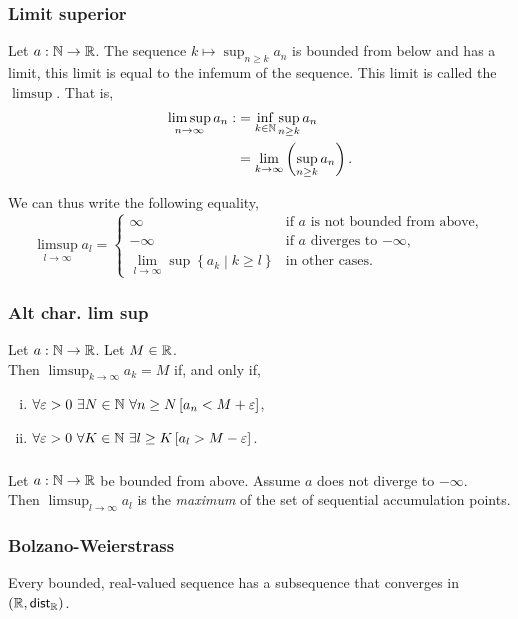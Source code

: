 \subsubsection*{Limit superior}
\udef Let $a : \mathbb{N} \to \mathbb{R}$. The sequence $k \mapsto \sup_{n \geq k} a_n$ is bounded
from below and has a limit, this limit is equal to the infemum of the sequence.
This limit is called the $\limsup$. That is,
\begin{align*}
    \limsup_{n \to \infty} a_n :&= \inf_{k \in \mathbb{N}} \sup_{n \geq k} a_n\\ 
        &= \lim_{k \to \infty} \left( \sup_{n \geq k} a_n \right).
\end{align*}

We can thus write the following equality,
\[
    \limsup_{l \to \infty} a_l = \begin{cases}
        \infty & \text{if  $a$ is not bounded from above},\\
        -\infty & \text{if $a$ diverges to $-\infty$},\\
        \lim_{l \to \infty} \sup \left\{ a_k \middle| k \geq l \right\}
            & \text{in other cases}.
    \end{cases}
\]

\newpage

\subsubsection*{Alt char. lim sup}
Let $a : \mathbb{N} \to \mathbb{R}$. Let $M \in \mathbb{R}$.\\
Then $\limsup_{k \to \infty} a_k = M$ if, and only if,
\begin{enumerate}[(i)]
    \item $\forall \varepsilon > 0\ \exists N \in \mathbb{N}\ \forall n \geq N \left[ a_n < M + \varepsilon \right]$,
    \item $\forall \varepsilon > 0\ \forall K \in \mathbb{N}\ \exists l \geq K \left[ a_l > M - \varepsilon \right]$.
\end{enumerate}

\subsubsection*{}
\uthm Let $a : \mathbb{N} \to \mathbb{R}$ be bounded from above. Assume $a$ does not diverge to
$-\infty$.\\ Then $\limsup_{l \to \infty} a_l$ is the \emph{maximum} of the set
of sequential accumulation points.

\subsubsection*{Bolzano-Weierstrass}
\uthm Every bounded, real-valued sequence has a subsequence that converges
in $(\mathbb{R}, \mathsf{dist}_{\mathbb{R}})$.


